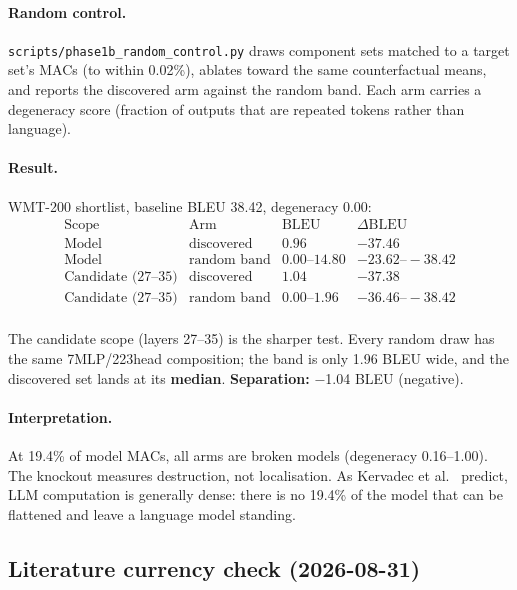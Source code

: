 \documentclass[11pt,a4paper]{article}
\begin{document}
\paragraph{Random control.} \texttt{scripts/phase1b\_random\_control.py} draws component
sets matched to a target set's MACs (to within 0.02\%), ablates toward the same
counterfactual means, and reports the discovered arm against the random band. Each arm
carries a degeneracy score (fraction of outputs that are repeated tokens rather than
language).

\paragraph{Result.} WMT-200 shortlist, baseline BLEU 38.42, degeneracy 0.00:
\[
\begin{array}{lccc}
\text{Scope} & \text{Arm} & \text{BLEU} & \Delta\text{BLEU} \\ \hline
\text{Model} & \text{discovered} & 0.96 & -37.46 \\
\text{Model} & \text{random band} & 0.00\text{--}14.80 & -23.62\text{--}-38.42 \\
\text{Candidate (27--35)} & \text{discovered} & 1.04 & -37.38 \\
\text{Candidate (27--35)} & \text{random band} & 0.00\text{--}1.96 & -36.46\text{--}-38.42 \\
\end{array}
\]

The candidate scope (layers 27--35) is the sharper test. Every random draw has the same
7MLP/223head composition; the band is only 1.96 BLEU wide, and the discovered set lands
at its \textbf{median}. \textbf{Separation:} $-$1.04 BLEU (negative).

\paragraph{Interpretation.} At 19.4\% of model MACs, all arms are broken models
(degeneracy 0.16--1.00). The knockout measures destruction, not localisation. As
Kervadec et al.~\cite{kervadec} predict, LLM computation is generally dense: there is no
19.4\% of the model that can be flattened and leave a language model standing.

\subsection{Literature currency check (2026-08-31)}\label{sec:litcheck}
\end{document}
